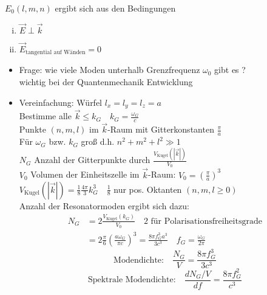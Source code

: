 \documentclass[titlepage,12pt,a4paper,ngerman]{report}
\newcommand{\tx}[1]{\textrm{#1}}
\begin{document}
$ E_0(l,m,n) $ ergibt sich aus den Bedingungen
\begin{enumerate}[i)]
	\item $ \vec{E} \perp \vec{k} $ 
	\item $ \vec{E}_{\tx{tangential auf Wänden}} = 0  $
\end{enumerate}
\begin{itemize}
	\item Frage: wie viele Moden unterhalb Grenzfrequenz $ \omega_0 $ gibt es ?\\
	wichtig bei der Quantenmechanik Entwicklung 
	\item[] Vereinfachung: Würfel $ l_x = l_y = l_z = a $\\
	Bestimme alle $ \vec{k} \le k_G \quad k_G = \frac{\omega_G}{c} $\\
	Punkte $ (n,m,l) $ im $ \vec{k} $-Raum mit Gitterkonstanten $ \frac{\pi}{a} $\\
	Für $ \omega_G $ bzw. $ k_G $ groß d.h. $ n^2 + m^2 + l^2 \gg 1 $\\
	$ N_G $ Anzahl der Gitterpunkte durch $ \frac{V_{\tx{Kugel}}(|\vec{k}|)}{V_0} $\\
	$ V_0 $ Volumen der Einheitszelle im $ \vec{k} $-Raum: $ V_0 = (\frac{\pi}{a})^3 $\\
	$ V_{\tx{Kugel}}(|\vec{k}|) = \frac{1}{8} \frac{4\pi}{3} k_G^3 \quad \frac{1}{8} $ nur pos. Oktanten $ (n,m,l \ge 0) $\\
	Anzahl der Resonatormoden ergibt sich dazu:
	\begin{align*}
	N_G &= 2 \frac{V_{\tx{Kugel}} (k_G) }{V_0} \quad 2 \tx{ für Polarisationsfreiheitsgrade}\\
	&= 2 \frac{\pi}{6} (\frac{a\omega_G}{\pi c}) ^3 = \frac{8 \pi f_{G}^3 a^3}{3 c^3} \quad f_G = \frac{\omega_G}{2 \pi}
	\end{align*}
	$$\tx{Modendichte:}\quad \frac{N_G}{V} = \frac{ 8 \pi f_G^3}{3 c^3}$$
	$$\tx{Spektrale Modendichte:} \quad \frac{d N_G/V}{df} = \frac{8 \pi f_G^2}{c^3}$$
\end{itemize}
\end{document}
